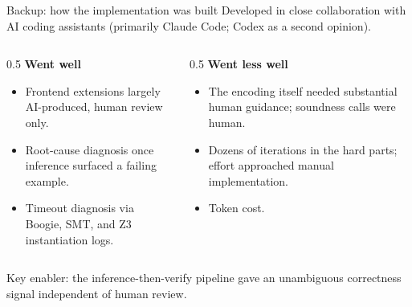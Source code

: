 \documentclass[aspectratio=169,11pt]{beamer}
\begin{document}
\begin{frame}{Backup: how the implementation was built}
  Developed in close collaboration with AI coding assistants (primarily Claude Code; Codex as a second opinion).
  \begin{columns}[T]
    \begin{column}{0.5\textwidth}
      \textbf{Went well}
      \begin{itemize}
        \item Frontend extensions largely AI-produced, human review only.
        \item Root-cause diagnosis once inference surfaced a failing example.
        \item Timeout diagnosis via Boogie, SMT, and Z3 instantiation logs.
      \end{itemize}
    \end{column}
    \begin{column}{0.5\textwidth}
      \textbf{Went less well}
      \begin{itemize}
        \item The encoding itself needed substantial human guidance; soundness calls were human.
        \item Dozens of iterations in the hard parts; effort approached manual implementation.
        \item Token cost.
      \end{itemize}
    \end{column}
  \end{columns}
  Key enabler: the inference-then-verify pipeline gave an unambiguous correctness signal independent of human review.
\end{frame}
\end{document}
